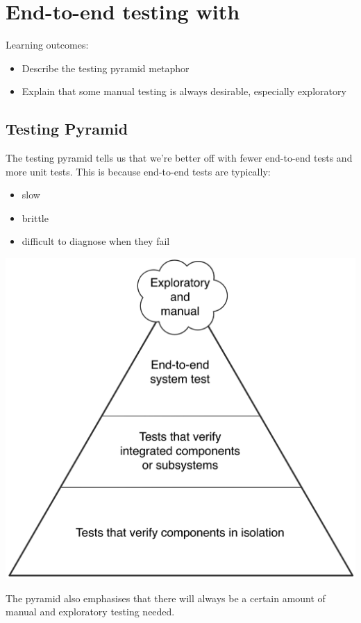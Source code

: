 \chapter*{End-to-end testing with \CUKE{}}

\ifnotes

    Learning outcomes:
    
    \begin{itemize}
        \item Describe the testing pyramid metaphor
        \item Explain that some manual testing is always desirable, especially exploratory
    \end{itemize}

\fi 

\ifcontent 
    \section*{Testing Pyramid}
    
    The testing pyramid tells us that we're better off with fewer end-to-end tests and more unit tests. This is because end-to-end tests are typically:
    
    \begin{itemize}
        \item slow
        \item brittle
        \item difficult to diagnose when they fail
    \end{itemize}
    
    \includegraphics[width=\textwidth]{images/pyramid}
    
    The pyramid also emphasises that there will always be a certain amount of manual and exploratory testing needed.
\fi